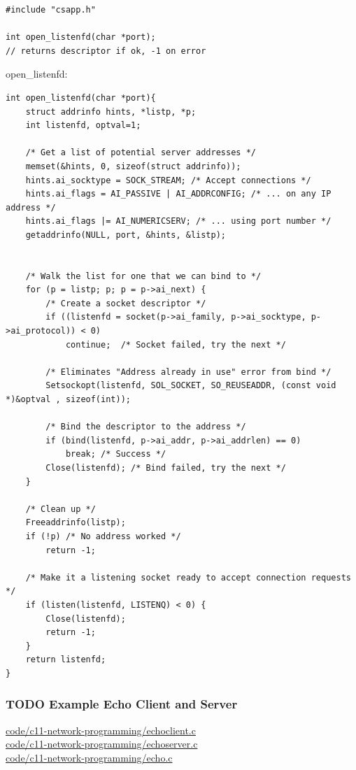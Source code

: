 \documentclass[11pt]{article}
\begin{document}
\begin{enumerate}
\begin{verbatim}
#include "csapp.h"

int open_listenfd(char *port);
// returns descriptor if ok, -1 on error
\end{verbatim}

open\_listenfd:\\

\begin{verbatim}
int open_listenfd(char *port){
    struct addrinfo hints, *listp, *p;
    int listenfd, optval=1;

    /* Get a list of potential server addresses */
    memset(&hints, 0, sizeof(struct addrinfo));
    hints.ai_socktype = SOCK_STREAM; /* Accept connections */
    hints.ai_flags = AI_PASSIVE | AI_ADDRCONFIG; /* ... on any IP address */
    hints.ai_flags |= AI_NUMERICSERV; /* ... using port number */
    getaddrinfo(NULL, port, &hints, &listp);


    /* Walk the list for one that we can bind to */
    for (p = listp; p; p = p->ai_next) {
        /* Create a socket descriptor */
        if ((listenfd = socket(p->ai_family, p->ai_socktype, p->ai_protocol)) < 0)
            continue;  /* Socket failed, try the next */

        /* Eliminates "Address already in use" error from bind */
        Setsockopt(listenfd, SOL_SOCKET, SO_REUSEADDR, (const void *)&optval , sizeof(int));

        /* Bind the descriptor to the address */
        if (bind(listenfd, p->ai_addr, p->ai_addrlen) == 0)
            break; /* Success */
        Close(listenfd); /* Bind failed, try the next */
    }

    /* Clean up */
    Freeaddrinfo(listp);
    if (!p) /* No address worked */
        return -1;

    /* Make it a listening socket ready to accept connection requests */
    if (listen(listenfd, LISTENQ) < 0) {
        Close(listenfd);
        return -1;
    }
    return listenfd;
}

\end{verbatim}
\end{enumerate}

\subsubsection{{\bfseries\sffamily TODO} Example Echo Client and Server}
\label{sec:org89f2400}

\url{code/c11-network-programming/echoclient.c}\\
\url{code/c11-network-programming/echoserver.c}\\
\url{code/c11-network-programming/echo.c}\\
\end{document}
